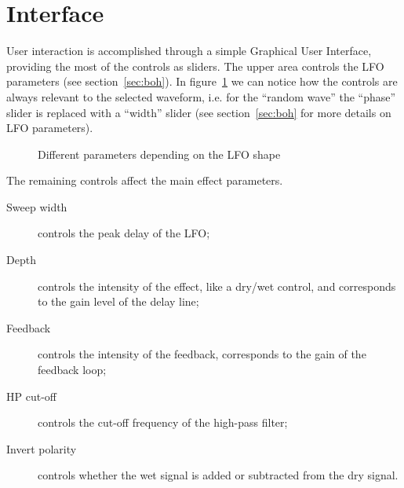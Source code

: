 \section{Interface}\label{sec:gui}

User interaction is accomplished through a simple Graphical User Interface, providing the most of the controls as sliders.
The upper area controls the LFO parameters (see section~\ref{sec:boh}). In figure~\ref{fig:gui-lfo} we can notice how the controls are always relevant to the selected waveform, i.e. for the ``random wave'' the ``phase'' slider is replaced with a ``width'' slider (see section~\ref{sec:boh} for more details on LFO parameters).

\begin{figure}[H]
	\centering
	\caption{Different parameters depending on the LFO shape}
	\label{fig:gui-lfo}
\end{figure}

The remaining controls affect the main effect parameters.

\begin{description}
	\item[Sweep width] controls the peak delay of the LFO;
	\item[Depth] controls the intensity of the effect, like a dry/wet control, and corresponds to the gain level of the delay line;
	\item[Feedback] controls the intensity of the feedback, corresponds to the gain of the feedback loop;
	\item[HP cut-off] controls the cut-off frequency of the high-pass filter;
	\item[Invert polarity] controls whether the wet signal is added or subtracted from the dry signal.
\end{description}

